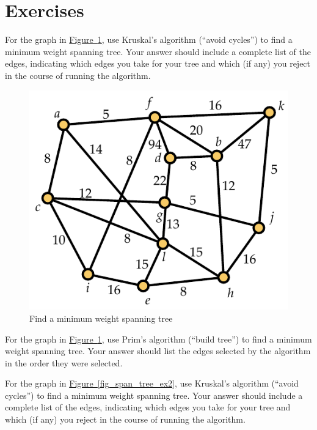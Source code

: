 \documentclass[10pt,]{book}
\theoremstyle{plain}
\theoremstyle{definition}
\theoremstyle{definition}
\theoremstyle{definition}
\theoremstyle{definition}
\numberwithin{equation}{section}
\begin{document}
\section[{Exercises}]{Exercises}\label{s_graphalgorithms_exercises}
\begin{exerciselist}
\item[1.]\hypertarget{exercise-13}{}\hypertarget{p-246}{}%
For the graph in \hyperref[fig_span_tree_ex1]{Figure~\ref{fig_span_tree_ex1}}, use Kruskal's algorithm (``avoid cycles'') to find a minimum weight spanning tree. Your answer should include a complete list of the edges, indicating which edges you take for your tree and which (if any) you reject in the course of running the algorithm.%
\begin{figure}
\centering
\includegraphics[width=0.65\linewidth]{images/span_tree_ex1}
\caption{Find a minimum weight spanning tree\label{fig_span_tree_ex1}}
\end{figure}
\par\smallskip
\item[2.]\hypertarget{exercise-14}{}\hypertarget{p-247}{}%
For the graph in \hyperref[fig_span_tree_ex1]{Figure~\ref{fig_span_tree_ex1}}, use Prim's algorithm (``build tree'') to find a minimum weight spanning tree. Your answer should list the edges selected by the algorithm in the order they were selected.%
\par\smallskip
\item[3.]\hypertarget{exercise-15}{}\hypertarget{p-248}{}%
For the graph in \hyperref[fig_span_tree_ex2]{Figure~\ref{fig_span_tree_ex2}}, use Kruskal's algorithm (``avoid cycles'') to find a minimum weight spanning tree. Your answer should include a complete list of the edges, indicating which edges you take for your tree and which (if any) you reject in the course of running the algorithm.%
\begin{figure}

\end{figure}
\end{exerciselist}
\end{document}
